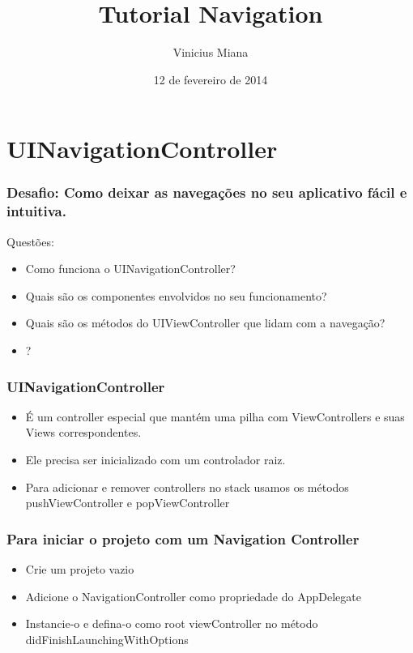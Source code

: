 \documentclass[serif,mathserif]{beamer}
\author[Vinicius Miana]{Vinicius Miana}
\title[Short Title\hspace{2em}\insertframenumber/\inserttotalframenumber]{Tutorial Navigation}
\date{12 de fevereiro de 2014} %
\institute{Universidade Presbiteriana Mackenzie}
\begin{document}

\maketitle

\section{UINavigationController}  


\begin{frame}
  \frametitle{Desafio: Como deixar as navegações no seu aplicativo fácil e intuitiva.}
   Questões:
  \begin{itemize}
  \item Como funciona o UINavigationController? 
  \item Quais são os componentes envolvidos no seu funcionamento?
  \item Quais são os métodos do UIViewController que lidam com a navegação?
  \item ?
  \end{itemize}
\end{frame}


\begin{frame}
  \frametitle{UINavigationController}
  \begin{itemize}
  \item É um controller especial que mantém uma pilha com ViewControllers e suas Views correspondentes.
  \item Ele precisa ser inicializado com um controlador raiz.
  \item Para adicionar e remover controllers no stack usamos os métodos pushViewController e popViewController
  \end{itemize}
\end{frame}



\begin{frame}
  \frametitle{Para iniciar o projeto com um Navigation Controller}
  \begin{itemize}
  \item Crie um projeto vazio
  \item Adicione o NavigationController como propriedade do AppDelegate
  \item Instancie-o e defina-o como root viewController no método didFinishLaunchingWithOptions
  \end{itemize}
\end{frame}
\end{document}
